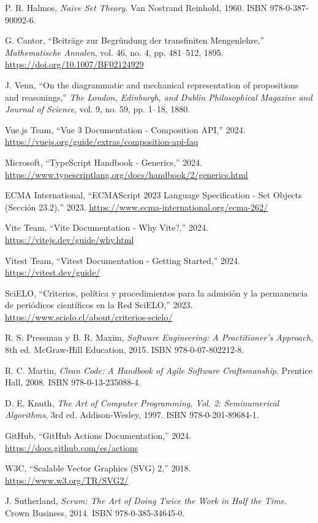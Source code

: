 \documentclass[11pt,a4paper]{article}
\begin{document}
\begin{enumerate}[label={[\arabic*]}]
    \item P. R. Halmos, \textit{Naive Set Theory}. Van Nostrand Reinhold, 1960. ISBN 978-0-387-90092-6.
    \item G. Cantor, ``Beiträge zur Begründung der transfiniten Mengenlehre,'' \textit{Mathematische Annalen}, vol. 46, no. 4, pp. 481--512, 1895. \url{https://doi.org/10.1007/BF02124929}
    \item J. Venn, ``On the diagrammatic and mechanical representation of propositions and reasonings,'' \textit{The London, Edinburgh, and Dublin Philosophical Magazine and Journal of Science}, vol. 9, no. 59, pp. 1--18, 1880.
    \item Vue.js Team, ``Vue 3 Documentation - Composition API,'' 2024. \url{https://vuejs.org/guide/extras/composition-api-faq}
    \item Microsoft, ``TypeScript Handbook - Generics,'' 2024. \url{https://www.typescriptlang.org/docs/handbook/2/generics.html}
    \item ECMA International, ``ECMAScript 2023 Language Specification - Set Objects (Sección 23.2),'' 2023. \url{https://www.ecma-international.org/ecma-262/}
    \item Vite Team, ``Vite Documentation - Why Vite?,'' 2024. \url{https://vitejs.dev/guide/why.html}
    \item Vitest Team, ``Vitest Documentation - Getting Started,'' 2024. \url{https://vitest.dev/guide/}
    \item SciELO, ``Criterios, política y procedimientos para la admisión y la permanencia de periódicos científicos en la Red SciELO,'' 2023. \url{https://www.scielo.cl/about/criterios-scielo/}
    \item R. S. Pressman y B. R. Maxim, \textit{Software Engineering: A Practitioner's Approach}, 8th ed. McGraw-Hill Education, 2015. ISBN 978-0-07-802212-8.
    \item R. C. Martin, \textit{Clean Code: A Handbook of Agile Software Craftsmanship}. Prentice Hall, 2008. ISBN 978-0-13-235088-4.
    \item D. E. Knuth, \textit{The Art of Computer Programming, Vol. 2: Seminumerical Algorithms}, 3rd ed. Addison-Wesley, 1997. ISBN 978-0-201-89684-1.
    \item GitHub, ``GitHub Actions Documentation,'' 2024. \url{https://docs.github.com/es/actions}
    \item W3C, ``Scalable Vector Graphics (SVG) 2,'' 2018. \url{https://www.w3.org/TR/SVG2/}
    \item J. Sutherland, \textit{Scrum: The Art of Doing Twice the Work in Half the Time}. Crown Business, 2014. ISBN 978-0-385-34645-0.
\end{enumerate}
\end{document}
